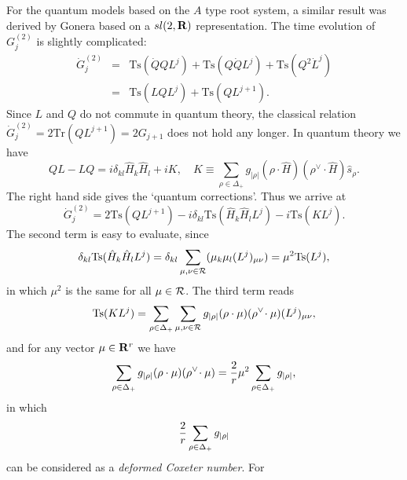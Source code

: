\documentclass[a4paper,12pt]{article}
\begin{document}
\noindent
For the quantum models based on the $A$ type root system,
a similar result was derived by Gonera \cite{Gonera1} based
  on a $sl(2,{\bf R})$ representation.
The time evolution of $G_{j}^{(2)}$ is slightly complicated:
\begin{eqnarray}
    \dot{G}_{j}^{(2)} & = &
    \mbox{Ts}(\dot{Q}QL^{j})+\mbox{Ts}(Q\dot{Q}L^{j})
     +\mbox{Ts}(Q^{2}\dot{L}^{j})
    \nonumber  \\
     & = & \mbox{Ts}(LQL^{j})+\mbox{Ts}(QL^{j+1}).
    \label{Hevo}
\end{eqnarray}
Since $L$ and $Q$ do not commute in quantum theory, the classical
relation \(\dot{G}_{j}^{(2)}=2\mbox{Tr}(QL^{j+1})=2G_{j+1}\) does not
hold any longer. In quantum theory we have
\begin{equation}
    QL-LQ=i\delta_{kl}\hat{H}_{k}\hat{H}_{l}+iK,
    \quad
    K\equiv
\sum_{\rho\in\Delta_{+}}g_{|\rho|}(\rho\cdot\hat{H})
    ({\rho}^{\vee}\!\cdot\hat{H})\hat{s}_{\rho}.
    \label{QLcomm}
\end{equation}
The right hand side gives the `quantum corrections'. Thus we arrive at
\begin{equation}
    \dot{G}_{j}^{(2)}=2\mbox{Ts}(QL^{j+1})-i\delta_{kl}\mbox{Ts}
    (\hat{H}_{k}\hat{H}_{l}L^j)-i\mbox{Ts}(KL^j).
    \label{hatHeq}
\end{equation}
The second term is easy to evaluate, since
\begin{equation}
    \delta_{kl}\mbox{Ts}
    (\hat{H}_{k}\hat{H}_{l}L^j)=\delta_{kl}\sum_{\mu,\nu\in{\cal
    R}}(\mu_{k}\mu_{l}(L^j)_{\mu\nu})=\mu^2\mbox{Ts}(L^j),
    \label{qcfirst}
\end{equation}
in which $\mu^2$ is the same  for all $\mu\in{\cal R}$. The third
term reads
\begin{displaymath}
\mbox{Ts}(KL^j)=\sum_{\rho\in\Delta_{+}}\sum_{\mu,\nu\in{\cal
R}} g_{|\rho|}(\rho\cdot\mu)
    ({\rho}^{\vee}\!\cdot\mu)(L^{j})_{\mu\nu},
\end{displaymath}
and for any vector $\mu\in{\bf R}^{r}$ we have
\begin{equation}
    \sum_{\rho\in\Delta_{+}}g_{|\rho|}(\rho\cdot\mu)
    ({\rho}^{\vee}\!\cdot\mu)=
    {2\over{r}}\mu^{2} \sum_{\rho\in\Delta_{+}}g_{|\rho|},
    \label{Keig}
\end{equation}
in which
\begin{equation}
     {2\over{r}} \sum_{\rho\in\Delta_{+}}g_{|\rho|}
    \label{defCox}
\end{equation}
can be considered as a {\em deformed Coxeter number}. For
\end{document}

